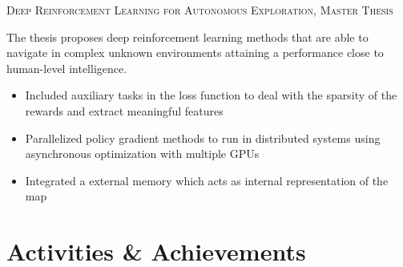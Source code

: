 \documentclass[11pt,a4paper,sans]{moderncv}
\begin{document}
\cventry{}
	{\vspace{-0.4cm}}
	{\textsc{Deep Reinforcement Learning for Autonomous Exploration, Master Thesis}}{}{}
	{
	The thesis proposes deep reinforcement learning methods that are able to navigate in complex unknown environments attaining a performance close to human-level intelligence. 		
	\vspace{1mm}
	\begin{itemize}
		\item Included auxiliary tasks in the loss function to deal with the sparsity of the rewards and extract meaningful features
		\item Parallelized policy gradient methods to run in distributed systems using asynchronous optimization with multiple GPUs 
		\item Integrated a external memory which acts as internal representation of the map		
	\end{itemize}
	}

\section{\LARGE{Activities \& Achievements}}
\vspace{2mm}
\end{document}
